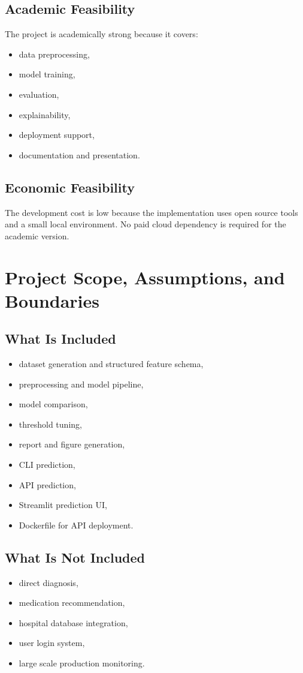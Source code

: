 \documentclass[12pt,a4paper,openany]{report}
\begin{document}
    \section{Academic Feasibility}
    The project is academically strong because it covers:
    \begin{itemize}[leftmargin=1.4cm]
    \item data preprocessing,
    \item model training,
    \item evaluation,
    \item explainability,
    \item deployment support,
    \item documentation and presentation.
    \end{itemize}

    \section{Economic Feasibility}
    The development cost is low because the implementation uses open source tools and a small local environment. No paid cloud dependency is required for the academic version.

    \chapter{Project Scope, Assumptions, and Boundaries}
    \section{What Is Included}
    \begin{itemize}[leftmargin=1.4cm]
    \item dataset generation and structured feature schema,
    \item preprocessing and model pipeline,
    \item model comparison,
    \item threshold tuning,
    \item report and figure generation,
    \item CLI prediction,
    \item API prediction,
    \item Streamlit prediction UI,
    \item Dockerfile for API deployment.
    \end{itemize}

    \section{What Is Not Included}
    \begin{itemize}[leftmargin=1.4cm]
    \item direct diagnosis,
    \item medication recommendation,
    \item hospital database integration,
    \item user login system,
    \item large scale production monitoring.
    \end{itemize}
\end{document}
